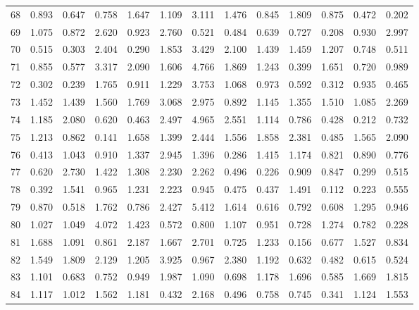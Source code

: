 \begin{tabular}{lrrrrrrrrrrrr}
68  &  0.893 &  0.647 &  0.758 &  1.647 &  1.109 &  3.111 &  1.476 &  0.845 &  1.809 &  0.875 &  0.472 &  0.202 \\
69  &  1.075 &  0.872 &  2.620 &  0.923 &  2.760 &  0.521 &  0.484 &  0.639 &  0.727 &  0.208 &  0.930 &  2.997 \\
70  &  0.515 &  0.303 &  2.404 &  0.290 &  1.853 &  3.429 &  2.100 &  1.439 &  1.459 &  1.207 &  0.748 &  0.511 \\
71  &  0.855 &  0.577 &  3.317 &  2.090 &  1.606 &  4.766 &  1.869 &  1.243 &  0.399 &  1.651 &  0.720 &  0.989 \\
72  &  0.302 &  0.239 &  1.765 &  0.911 &  1.229 &  3.753 &  1.068 &  0.973 &  0.592 &  0.312 &  0.935 &  0.465 \\
73  &  1.452 &  1.439 &  1.560 &  1.769 &  3.068 &  2.975 &  0.892 &  1.145 &  1.355 &  1.510 &  1.085 &  2.269 \\
74  &  1.185 &  2.080 &  0.620 &  0.463 &  2.497 &  4.965 &  2.551 &  1.114 &  0.786 &  0.428 &  0.212 &  0.732 \\
75  &  1.213 &  0.862 &  0.141 &  1.658 &  1.399 &  2.444 &  1.556 &  1.858 &  2.381 &  0.485 &  1.565 &  2.090 \\
76  &  0.413 &  1.043 &  0.910 &  1.337 &  2.945 &  1.396 &  0.286 &  1.415 &  1.174 &  0.821 &  0.890 &  0.776 \\
77  &  0.620 &  2.730 &  1.422 &  1.308 &  2.230 &  2.262 &  0.496 &  0.226 &  0.909 &  0.847 &  0.299 &  0.515 \\
78  &  0.392 &  1.541 &  0.965 &  1.231 &  2.223 &  0.945 &  0.475 &  0.437 &  1.491 &  0.112 &  0.223 &  0.555 \\
79  &  0.870 &  0.518 &  1.762 &  0.786 &  2.427 &  5.412 &  1.614 &  0.616 &  0.792 &  0.608 &  1.295 &  0.946 \\
80  &  1.027 &  1.049 &  4.072 &  1.423 &  0.572 &  0.800 &  1.107 &  0.951 &  0.728 &  1.274 &  0.782 &  0.228 \\
81  &  1.688 &  1.091 &  0.861 &  2.187 &  1.667 &  2.701 &  0.725 &  1.233 &  0.156 &  0.677 &  1.527 &  0.834 \\
82  &  1.549 &  1.809 &  2.129 &  1.205 &  3.925 &  0.967 &  2.380 &  1.192 &  0.632 &  0.482 &  0.615 &  0.524 \\
83  &  1.101 &  0.683 &  0.752 &  0.949 &  1.987 &  1.090 &  0.698 &  1.178 &  1.696 &  0.585 &  1.669 &  1.815 \\
84  &  1.117 &  1.012 &  1.562 &  1.181 &  0.432 &  2.168 &  0.496 &  0.758 &  0.745 &  0.341 &  1.124 &  1.553 \\

\end{tabular}
